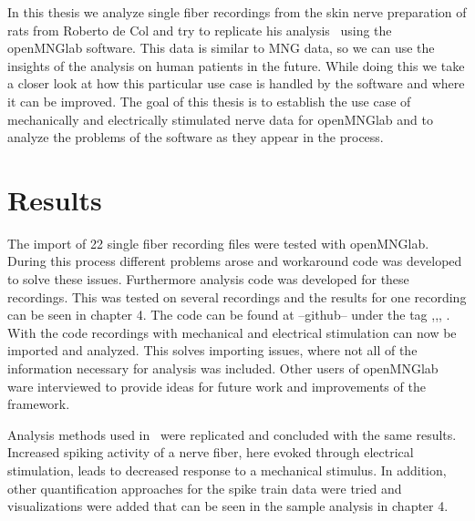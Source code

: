 In this thesis we analyze single fiber recordings from the skin nerve preparation of rats from Roberto de Col and try to replicate his analysis~\cite{roberto} using the openMNGlab software. This data is similar to MNG data, so we can use the insights of the analysis on human patients in the future. While doing this we take a closer look at how this particular use case is handled by the software and where it can be improved.
The goal of this thesis is to establish the use case of mechanically and electrically stimulated nerve data for openMNGlab and to analyze the problems of the software as they appear in the process.

\section{Results}
The import of 22 single fiber recording files were tested with openMNGlab. During this process different problems arose and workaround code was developed to solve these issues. Furthermore analysis code was developed for these recordings. This was tested on several recordings and the results for one recording can be seen in chapter 4. The code can be found at --github-- under the tag ,,, . With the code recordings with mechanical and electrical stimulation can now be imported and analyzed. This solves importing issues, where not all of the information necessary for analysis was included. Other users of openMNGlab ware interviewed to provide ideas for future work and improvements of the framework.

Analysis methods used in~\cite{roberto} were replicated and concluded with the same results. Increased spiking activity of a nerve fiber, here evoked through electrical stimulation, leads to decreased response to a mechanical stimulus. In addition, other quantification approaches for the spike train data were tried and visualizations were added that can be seen in the sample analysis in chapter 4.


